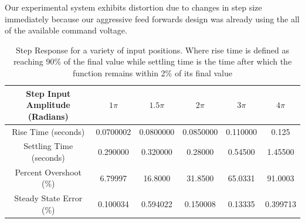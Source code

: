 \documentclass[letterpaper]{article}
\begin{document}
Our experimental system exhibits distortion due to changes in step size immediately  because our aggressive feed forwards design was already using the all of the available command voltage.
\begin{table}[htb]
\begin{center}
    \begin{tabular}{|c|c|c|c|c|c|}
        \hline
        Step Input Amplitude (Radians) & $1\pi$   & $1.5 \pi$ & $2\pi$   & $3\pi$   & $4\pi$   \\ \hline
        Rise Time (seconds)            & 0.0700002 & 0.0800000   & 0.0850000 & 0.110000 & 0.125    \\ 
        Settling Time (seconds)        & 0.290000   & 0.320000    & 0.28000   & 0.54500  & 1.45500  \\ 
        Percent Overshoot (\%)          & 6.79997   & 16.8000     & 31.8500   & 65.0331  & 91.0003  \\ 
        Steady State Error (\%)         & 0.100034  & 0.594022    & 0.150008  & 0.13335  & 0.399713 \\
        \hline
    \end{tabular}
\end{center}
\caption{Step Response for a variety of input positions.  Where rise time is defined as reaching 90\% of the final value while settling time is the time after which the function remains within 2\% of its final value}
\label{q5_b6}
\end{table}
\end{document}
